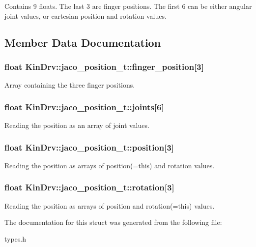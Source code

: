 Contains 9 floats. The last 3 are finger positions. The first 6 can be either angular joint values, or cartesian position and rotation values. 

\subsection{Member Data Documentation}
\hypertarget{structKinDrv_1_1jaco__position__t_a6002dbd691637b90deaccc69e2f5d07d}{
\subsubsection[{finger\+\_\+position}]{\setlength{\rightskip}{0pt plus 5cm}float Kin\+Drv\+::jaco\+\_\+position\+\_\+t\+::finger\+\_\+position\mbox{[}3\mbox{]}}}\label{structKinDrv_1_1jaco__position__t_a6002dbd691637b90deaccc69e2f5d07d}
Array containing the three finger positions. \hypertarget{structKinDrv_1_1jaco__position__t_a6468a318e932c3de3c3eb6bc635f9ec5}{
\subsubsection[{joints}]{\setlength{\rightskip}{0pt plus 5cm}float Kin\+Drv\+::jaco\+\_\+position\+\_\+t\+::joints\mbox{[}6\mbox{]}}}\label{structKinDrv_1_1jaco__position__t_a6468a318e932c3de3c3eb6bc635f9ec5}
Reading the position as an array of joint values. \hypertarget{structKinDrv_1_1jaco__position__t_ae9e89e3dcee621d173f51a31205fd876}{
\subsubsection[{position}]{\setlength{\rightskip}{0pt plus 5cm}float Kin\+Drv\+::jaco\+\_\+position\+\_\+t\+::position\mbox{[}3\mbox{]}}}\label{structKinDrv_1_1jaco__position__t_ae9e89e3dcee621d173f51a31205fd876}
Reading the position as arrays of position(=this) and rotation values. \hypertarget{structKinDrv_1_1jaco__position__t_a571a8abbb90baf738130946b06d2808d}{
\subsubsection[{rotation}]{\setlength{\rightskip}{0pt plus 5cm}float Kin\+Drv\+::jaco\+\_\+position\+\_\+t\+::rotation\mbox{[}3\mbox{]}}}\label{structKinDrv_1_1jaco__position__t_a571a8abbb90baf738130946b06d2808d}
Reading the position as arrays of position and rotation(=this) values. 

The documentation for this struct was generated from the following file\+:\begin{DoxyCompactItemize}
\item 
types.\+h\end{DoxyCompactItemize}
